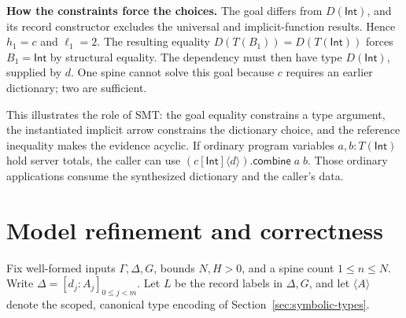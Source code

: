 \documentclass[10pt,a4paper]{article}
\newcommand{\Int}{\mathsf{Int}}
\newcommand{\iarg}[1]{\langle#1\rangle}
\newcommand{\kw}[1]{\mathsf{#1}}
\begin{document}
\textbf{How the constraints force the choices.}
The goal differs from $D(\Int)$, and its record constructor excludes the universal
and implicit-function results. Hence $h_1=c$ and $\ell_1=2$.
The resulting equality $D(T(B_1))=D(T(\Int))$ forces $B_1=\Int$ by structural
equality. The dependency must then have type $D(\Int)$, supplied by $d$.
One spine cannot solve this goal because $c$ requires an earlier dictionary;
two are sufficient.

This illustrates the role of SMT: the goal equality constrains a type argument,
the instantiated implicit arrow constrains the dictionary choice, and the reference
inequality makes the evidence acyclic. If ordinary program variables $a,b:T(\Int)$
hold server totals, the caller can use $(c[\Int]\iarg{d}).\kw{combine}\;a\;b$.
Those ordinary applications consume the synthesized dictionary and the caller's data.

\newpage
\section{Model refinement and correctness}
\label{sec:refinement}
Fix well-formed inputs $\Gamma,\Delta,G$, bounds $N,H>0$, and a spine count
$1\le n\le N$. Write $\Delta=[d_j:A_j]_{0\le j<m}$.
Let $L$ be the record labels in $\Delta,G$, and let $\langle A\rangle$ denote
the scoped, canonical type encoding of Section~\ref{sec:symbolic-types}.
\end{document}
